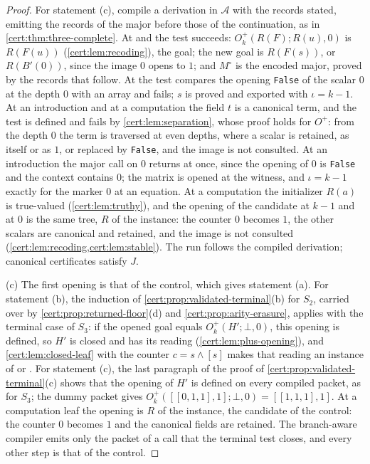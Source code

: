 \begin{proof}
For statement (c), compile a derivation in $\mathcal A$ with the records stated, emitting the
records of the major before those of the continuation, as in
\cref{cert:thm:three-complete}. At  and  the test succeeds:
$O^{+}_k(R(F);R(u),0)$ is $R(F(u))$ (\cref{cert:lem:recoding}), the goal; the new goal
is $R(F(s))$, or $R(B'(0))$, since the image $0$ opens to $1$; and $M^{\circ}$ is the
encoded major, proved by the records that follow. At  the test compares
the opening \texttt{False} of the scalar $0$ at the depth $0$ with an array and
fails; $s$ is proved and exported with $\iota=k-1$. At an introduction and at a
computation the field $t$ is a canonical term, and the test is defined and fails by
\cref{cert:lem:separation}, whose proof holds for $O^{+}$: from the depth $0$ the
term is traversed at even depths, where a scalar is retained, as itself or as $1$, or
replaced by \texttt{False}, and the image is not consulted. At an introduction the
major call on $0$ returns at once, since the opening of $0$ is \texttt{False} and the
context contains $0$; the matrix is opened at the witness, and $\iota=k-1$ exactly for
the marker $0$ at an equation. At a computation the initializer $R(a)$ is
true-valued (\cref{cert:lem:truthy}), and the opening of the candidate at $k-1$ and at
$0$ is the same tree, $R$ of the instance: the counter $0$ becomes $1$, the other
scalars are canonical and retained, and the image is not consulted
(\cref{cert:lem:recoding,cert:lem:stable}). The run follows the compiled derivation;
canonical certificates satisfy $J$.

(c) The first opening is that of the control, which gives statement (a). For
statement (b), the induction of \cref{cert:prop:validated-terminal}(b) for $S_2$, carried over by
\cref{cert:prop:returned-floor}(d) and \cref{cert:prop:arity-erasure}, applies with the
terminal case of $S_3$: if the opened goal equals $O^{+}_k(H';\bot,0)$, this opening is
defined, so $H'$ is closed and has its reading (\cref{cert:lem:plus-opening}), and
\cref{cert:lem:closed-leaf} with the counter $c=s\land[s]$ makes that reading an
instance of  or . For statement (c), the last paragraph of
the proof of \cref{cert:prop:validated-terminal}(c) shows that the opening of $H'$ is defined on
every compiled packet, as for $S_3$; the dummy packet gives
$O^{+}_k([[0,1,1],1];\bot,0)=[[1,1,1],1]$. At a computation leaf the opening is $R$ of
the instance, the candidate of the control: the counter $0$ becomes $1$ and the
canonical fields are retained. The branch-aware compiler emits only the packet of a
call that the terminal test closes, and every other step is that of the control.
\end{proof}

